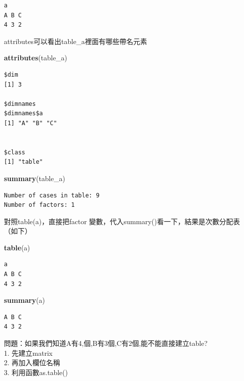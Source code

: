 \documentclass[]{book}
\newenvironment{Shaded}{\begin{snugshade}}{\end{snugshade}}
\newcommand{\KeywordTok}[1]{\textcolor[rgb]{0.13,0.29,0.53}{\textbf{#1}}}
\newcommand{\NormalTok}[1]{#1}
\theoremstyle{definition}
\theoremstyle{definition}
\theoremstyle{definition}
\theoremstyle{remark}
\begin{document}
\begin{verbatim}
a
A B C 
4 3 2 
\end{verbatim}

attributes可以看出table\_a裡面有哪些帶名元素

\begin{Shaded}
\begin{Highlighting}[]
\KeywordTok{attributes}\NormalTok{(table_a)}
\end{Highlighting}
\end{Shaded}

\begin{verbatim}
$dim
[1] 3

$dimnames
$dimnames$a
[1] "A" "B" "C"


$class
[1] "table"
\end{verbatim}

\begin{Shaded}
\begin{Highlighting}[]
\KeywordTok{summary}\NormalTok{(table_a)}
\end{Highlighting}
\end{Shaded}

\begin{verbatim}
Number of cases in table: 9 
Number of factors: 1 
\end{verbatim}

對照table(a)，直接把factor
變數，代入summary()看一下，結果是次數分配表（如下）

\begin{Shaded}
\begin{Highlighting}[]
\KeywordTok{table}\NormalTok{(a)}
\end{Highlighting}
\end{Shaded}

\begin{verbatim}
a
A B C 
4 3 2 
\end{verbatim}

\begin{Shaded}
\begin{Highlighting}[]
\KeywordTok{summary}\NormalTok{(a)}
\end{Highlighting}
\end{Shaded}

\begin{verbatim}
A B C 
4 3 2 
\end{verbatim}

問題：如果我們知道A有4,個,B有3個,C有2個,能不能直接建立table?\\
1. 先建立matrix\\
2. 再加入欄位名稱\\
3. 利用函數as.table()
\end{document}
